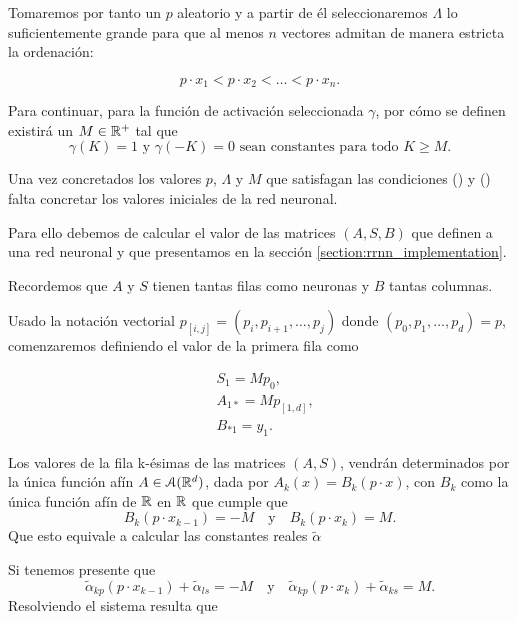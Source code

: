 Tomaremos por tanto un $p$ aleatorio y a partir de él 
seleccionaremos $\Lambda$ lo suficientemente grande para que
 al menos $n$ vectores admitan de manera estricta la ordenación: 

\begin{equation}\label{eq:method_inicializar_condition_desigualdad}
    p \cdot x_1 < 
    p \cdot x_2 
    < \ldots <
    p \cdot x_n.
\end{equation}

Para continuar, para la función de activación seleccionada $\gamma$, por cómo se definen existirá un $M \in \mathbb{R}^+$ tal que 
\begin{equation} \label{eq:method_inicializar_M}
    \gamma(K)=1 \text{ y } \gamma(-K)=0 
    \text{ sean constantes para todo }K \geq M.
\end{equation}

Una vez concretados los valores $p$, $\Lambda$ y $M$ que satisfagan las condiciones 
() 
y ()  
falta concretar los valores iniciales de la red neuronal. 

Para ello debemos de calcular el valor de las matrices $(A,S,B)$ que definen a una red neuronal y que presentamos en la sección \ref{section:rrnn_implementation}.

Recordemos que $A$ y $S$ tienen tantas filas como neuronas  y $B$ tantas columnas. 

Usado la notación vectorial
$p_{[i,j]} = (p_i, p_{i+1}, \ldots, p_{j})$ donde $(p_0, p_1, \ldots, p_d)=p$, comenzaremos definiendo el valor de la primera fila como

\begin{align}
    &S_1 = M p_0, \\
    & A_{1 *} = M p_{[1,d]}, \\
    & B_{* 1} = y_1.
\end{align}

Los valores de la fila  k-ésimas de las matrices $(A,S)$, vendrán determinados por la única función afín $A \in \mathcal{A}(\mathbb{R}^d)$, 
dada por $A_k(x)=B_k(p \cdot x)$, con $B_{k}$ como la única función afín de $\mathbb{R}$ en $\mathbb{R}$ que cumple que 
\begin{equation}
    B_k(p \cdot x_{k-1}) = -M 
    \quad \text{y} \quad 
     B_{k}(p \cdot x_k)= M.
\end{equation}
Que esto equivale a calcular las constantes reales $\tilde {\alpha}$ 

Si tenemos presente que 
\begin{equation}
    \tilde{\alpha}_{k p} (p \cdot x_{k-1}) + \tilde{\alpha}_{l s} = -M 
    \quad \text{y} \quad 
    \tilde{\alpha}_{k p}(p \cdot x_k) + \tilde{\alpha}_{k s}= M.
\end{equation} 
Resolviendo el sistema resulta que 

